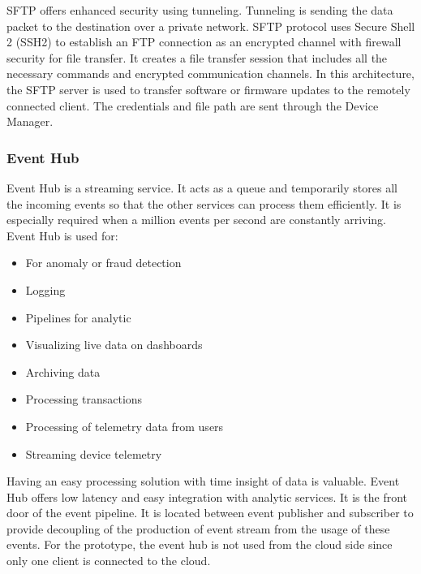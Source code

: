 \documentclass[12pt,a4paper]{article}
\begin{document}
{SFTP offers enhanced security using tunneling. Tunneling is sending the data packet to the destination over a private network. SFTP protocol uses Secure Shell 2 (SSH2) to establish an FTP connection as an encrypted channel with firewall security for file transfer. It creates a file transfer session that includes all the necessary commands and encrypted communication channels. \cite{r37} In this architecture, the SFTP server is used to transfer software or firmware updates to the remotely connected client. The credentials and file path are sent through the Device Manager.

\subsubsection{Event Hub}

Event Hub is a streaming service. It acts as a queue and temporarily stores all the incoming events so that the other services can process them efficiently. It is especially required when a million events per second are constantly arriving. Event Hub is used for: \cite{r36} \\

\begin{itemize}

\item For anomaly or fraud detection \cite{r36} 
\item Logging \cite{r36} 
\item Pipelines for analytic \cite{r36} 
\item Visualizing live data on dashboards \cite{r36} 
\item Archiving data \cite{r36} 
\item Processing transactions \cite{r36} 
\item Processing of telemetry data from users \cite{r36}
\item Streaming device telemetry \cite{r36}

\end{itemize}

Having an easy processing solution with time insight of data is valuable. Event Hub offers low latency and easy integration with analytic services. It is the front door of the event pipeline. It is located between event publisher and subscriber to provide decoupling of the production of event stream from the usage of these events. \cite{r36} For the prototype, the event hub is not used from the cloud side since only one client is connected to the cloud.

}
\end{document}
